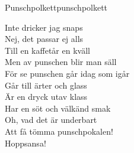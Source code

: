 \begin{song}{Punschpolkett}{punschpolkett}
\begin{vers}
Inte dricker jag snaps\\
Nej, det passar ej alls\\
Till en kaffetår en kväll\\
Men av punschen blir man säll\\
För se punschen går idag som igår\\
Går till ärter och glass\\
Är en dryck utav klass\\
Har en söt och välkänd smak\\
Oh, vad det är underbart\\
Att få tömma punschpokalen!\\
Hoppsansa!\\
\end{vers}
\end{song}
